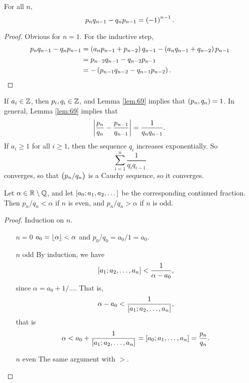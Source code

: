 \pagebreak

\begin{lemma}
\label{lem:69}
For all $ n $,
$$ p_nq_{n - 1} - q_np_{n - 1} = \br{-1}^{n - 1}. $$
\end{lemma}

\begin{proof}
Obvious for $ n = 1 $. For the inductive step,
\begin{align*}
p_nq_{n - 1} - q_np_{n - 1}
& = \br{a_np_{n - 1} + p_{n - 2}}q_{n - 1} - \br{a_nq_{n - 1} + q_{n - 2}}p_{n - 1} \\
& = p_{n - 2}q_{n - 1} - q_{n - 2}p_{n - 1} \\
& = -\br{p_{n - 1}q_{n - 2} - q_{n - 1}p_{n - 2}}.
\end{align*}
\end{proof}

\begin{note*}
If $ a_i \in \mathbb{Z} $, then $ p_i, q_i \in \mathbb{Z} $, and Lemma \ref{lem:69} implies that $ \br{p_n, q_n} = 1 $. In general, Lemma \ref{lem:69} implies that
$$ \abs{\dfrac{p_n}{q_n} - \dfrac{p_{n - 1}}{q_{n - 1}}} = \dfrac{1}{q_nq_{n - 1}}. $$
If $ a_i \ge 1 $ for all $ i \ge 1 $, then the sequence $ q_i $ increases exponentially. So
$$ \sum_{i = 1}^n \dfrac{1}{q_iq_{i - 1}} $$
converges, so that $ \br{p_n / q_n} $ is a Cauchy sequence, so it converges.
\end{note*}


\begin{lemma}
\label{lem:70}
Let $ \alpha \in \mathbb{R} \setminus \mathbb{Q} $, and let $ \sbr{a_0; a_1, a_2, \dots} $ be the corresponding continued fraction. Then $ p_n / q_n < \alpha $ if $ n $ is even, and $ p_n / q_n > \alpha $ if $ n $ is odd.
\end{lemma}

\begin{proof}
Induction on $ n $.
\begin{itemize}[leftmargin=0.5in]
\item[$ n = 0 $] $ a_0 = \left\lfloor \alpha \right\rfloor < \alpha $ and $ p_0 / q_0 = a_0 / 1 = a_0 $.
\item[$ n $ odd] By induction, we have
$$ \sbr{a_1; a_2, \dots, a_n} < \dfrac{1}{\alpha - a_0}, $$
since $ \alpha = a_0 + 1 / \dots $. That is,
$$ \alpha - a_0 < \dfrac{1}{\sbr{a_1; a_2, \dots, a_n}}, $$
that is
$$ \alpha < a_0 + \dfrac{1}{\sbr{a_1; a_2, \dots, a_n}} = \sbr{a_0; a_1, \dots, a_n} = \dfrac{p_n}{q_n}. $$
\item[$ n $ even] The same argument with $ > $.
\end{itemize}
\end{proof}

